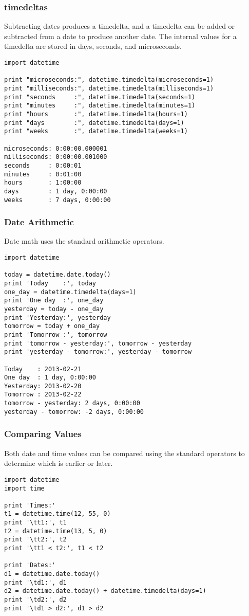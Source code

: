 \begin{frame}[fragile]\frametitle{ timedeltas}
Subtracting dates produces a timedelta, and a timedelta can be added or subtracted from a date to produce another date. The internal values for a timedelta are stored in days, seconds, and microseconds.
\begin{lstlisting}
import datetime

print "microseconds:", datetime.timedelta(microseconds=1)
print "milliseconds:", datetime.timedelta(milliseconds=1)
print "seconds     :", datetime.timedelta(seconds=1)
print "minutes     :", datetime.timedelta(minutes=1)
print "hours       :", datetime.timedelta(hours=1)
print "days        :", datetime.timedelta(days=1)
print "weeks       :", datetime.timedelta(weeks=1)

microseconds: 0:00:00.000001
milliseconds: 0:00:00.001000
seconds     : 0:00:01
minutes     : 0:01:00
hours       : 1:00:00
days        : 1 day, 0:00:00
weeks       : 7 days, 0:00:00
\end{lstlisting}
\end{frame}

\begin{frame}[fragile]\frametitle{ Date Arithmetic}
Date math uses the standard arithmetic operators. 
\begin{lstlisting}
import datetime

today = datetime.date.today()
print 'Today    :', today
one_day = datetime.timedelta(days=1)
print 'One day  :', one_day
yesterday = today - one_day
print 'Yesterday:', yesterday
tomorrow = today + one_day
print 'Tomorrow :', tomorrow
print 'tomorrow - yesterday:', tomorrow - yesterday
print 'yesterday - tomorrow:', yesterday - tomorrow

Today    : 2013-02-21
One day  : 1 day, 0:00:00
Yesterday: 2013-02-20
Tomorrow : 2013-02-22
tomorrow - yesterday: 2 days, 0:00:00
yesterday - tomorrow: -2 days, 0:00:00
\end{lstlisting}
\end{frame}

\begin{frame}[fragile]\frametitle{Comparing Values}
Both date and time values can be compared using the standard operators to determine which is earlier or later.
\begin{lstlisting}
import datetime
import time

print 'Times:'
t1 = datetime.time(12, 55, 0)
print '\tt1:', t1
t2 = datetime.time(13, 5, 0)
print '\tt2:', t2
print '\tt1 < t2:', t1 < t2

print 'Dates:'
d1 = datetime.date.today()
print '\td1:', d1
d2 = datetime.date.today() + datetime.timedelta(days=1)
print '\td2:', d2
print '\td1 > d2:', d1 > d2
\end{lstlisting}
\end{frame}


